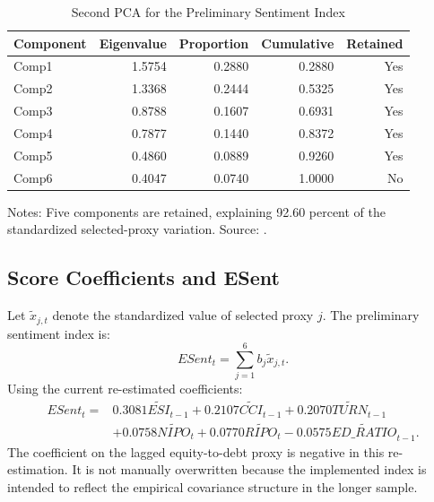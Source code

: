 \documentclass[12pt]{article}
\begin{document}
\begin{table}[htbp]
\centering
\caption{Second PCA for the Preliminary Sentiment Index}
\label{tab:stage2_pca}
\begin{tabular}{lrrrr}
\toprule
Component & Eigenvalue & Proportion & Cumulative & Retained \\
\midrule
Comp1 & 1.5754 & 0.2880 & 0.2880 & Yes \\
Comp2 & 1.3368 & 0.2444 & 0.5325 & Yes \\
Comp3 & 0.8788 & 0.1607 & 0.6931 & Yes \\
Comp4 & 0.7877 & 0.1440 & 0.8372 & Yes \\
Comp5 & 0.4860 & 0.0889 & 0.9260 & Yes \\
Comp6 & 0.4047 & 0.0740 & 1.0000 & No \\
\bottomrule
\end{tabular}
\begin{minipage}{0.95\textwidth}
\footnotesize
Notes: Five components are retained, explaining 92.60 percent of the standardized selected-proxy variation. Source: .
\end{minipage}
\end{table}

\subsection{Score Coefficients and ESent}

Let \(\tilde{x}_{j,t}\) denote the standardized value of selected proxy \(j\). The preliminary sentiment index is:
\[
ESent_t = \sum_{j=1}^{6} b_j \tilde{x}_{j,t}.
\]
Using the current re-estimated coefficients:
\begin{align*}
ESent_t ={}& 0.3081\widetilde{ESI}_{t-1}
 + 0.2107\widetilde{CCI}_{t-1}
 + 0.2070\widetilde{TURN}_{t-1} \\
& + 0.0758\widetilde{NIPO}_{t}
 + 0.0770\widetilde{RIPO}_{t}
 - 0.0575\widetilde{ED\_RATIO}_{t-1}.
\end{align*}
The coefficient on the lagged equity-to-debt proxy is negative in this re-estimation. It is not manually overwritten because the implemented index is intended to reflect the empirical covariance structure in the longer sample.
\end{document}
